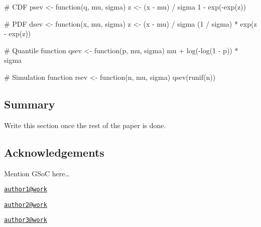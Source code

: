 \begin{Schunk}
\begin{Sinput}
# CDF
psev <- function(q, mu, sigma) {
    z <- (x - mu) / sigma
    1 - exp(-exp(z))
}

# PDF
dsev <- function(x, mu, sigma) {
  z <- (x - mu) / sigma
  (1 / sigma) * exp(z - exp(z))
}

# Quantile function
qsev <- function(p, mu, sigma) {
  mu + log(-log(1 - p)) * sigma
}

# Simulation function
rsev <- function(n, mu, sigma) {
  qsev(runif(n))
}
\end{Sinput}
\end{Schunk}

\subsection{Summary}\label{summary}

Write this section once the rest of the paper is done.



\subsection{Acknowledgements}\label{acknowledgements}

Mention GSoC here\ldots{}

\address{%
Author One\\
Affiliation\\
line 1\\ line 2\\
}
\href{mailto:author1@work}{\nolinkurl{author1@work}}

\address{%
Author Two\\
Affiliation\\
line 1\\ line 2\\
}
\href{mailto:author2@work}{\nolinkurl{author2@work}}

\address{%
Author Three\\
Affiliation\\
line 1\\ line 2\\
}
\href{mailto:author3@work}{\nolinkurl{author3@work}}

